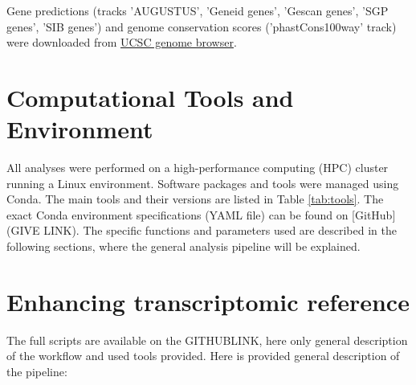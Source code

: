 Gene predictions (tracks 'AUGUSTUS', 'Geneid genes', 'Gescan genes', 'SGP genes', 'SIB genes') and 
genome conservation scores ('phastCons100way' track) were downloaded from \href{https://genome.ucsc.edu/}{UCSC genome browser}.

\section{Computational Tools and Environment}

All analyses were performed on a high-performance computing (HPC) cluster running a Linux environment.
Software packages and tools were managed using Conda.
The main tools and their versions are listed in Table \ref{tab:tools}.
The exact Conda environment specifications (YAML file) can be found on [GitHub](GIVE LINK).
The specific functions and parameters used are described in the following sections, where the general analysis pipeline will be explained.



\section{Enhancing transcriptomic reference}

The full scripts are available on the GITHUBLINK, here only general description of the workflow and used tools provided.
Here is provided general description of the pipeline:

